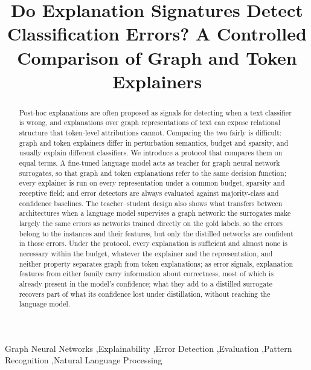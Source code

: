 
\title{Do Explanation Signatures Detect Classification Errors? A Controlled Comparison of Graph and Token Explainers}

\begin{abstract}
Post-hoc explanations are often proposed as signals for detecting when a text classifier is wrong, and explanations over graph representations of text can expose relational structure that token-level attributions cannot. Comparing the two fairly is difficult: graph and token explainers differ in perturbation semantics, budget and sparsity, and usually explain different classifiers. We introduce a protocol that compares them on equal terms. A fine-tuned language model acts as teacher for graph neural network surrogates, so that graph and token explanations refer to the same decision function; every explainer is run on every representation under a common budget, sparsity and receptive field; and error detectors are always evaluated against majority-class and confidence baselines. The teacher--student design also shows what transfers between architectures when a language model supervises a graph network: the surrogates make largely the same errors as networks trained directly on the gold labels, so the errors belong to the instances and their features, but only the distilled networks are confident in those errors. Under the protocol, every explanation is sufficient and almost none is necessary within the budget, whatever the explainer and the representation, and neither property separates graph from token explanations; as error signals, explanation features from either family carry information about correctness, most of which is already present in the model's confidence; what they add to a distilled surrogate recovers part of what its confidence lost under distillation, without reaching the language model.
\end{abstract}

\begin{keyword}
Graph Neural Networks \sep Explainability \sep Error Detection \sep Evaluation \sep Pattern Recognition \sep Natural Language Processing
\end{keyword}

